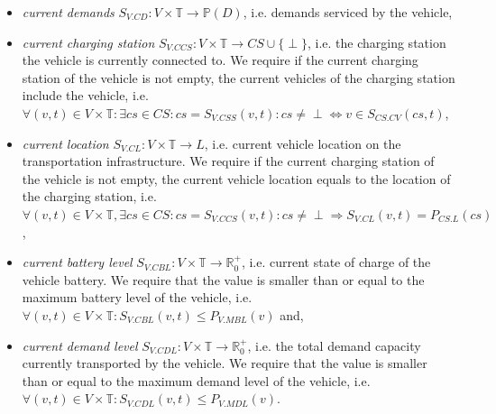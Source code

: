 \documentclass[graybox]{svmult}
\begin{document}
\begin{itemize}
	\item \textit{current demands} $S_{V.CD}: V \times \mathbb{T} \rightarrow \mathbb{P}(D)$, i.e. demands serviced by the vehicle,
	\item \textit{current charging station} $S_{V.CCS}: V \times \mathbb{T} \rightarrow CS \cup \{\perp\}$, i.e. the charging station the vehicle is currently connected to. We require if the current charging station of the vehicle is not empty, the current vehicles of the charging station include the vehicle, i.e.\ $\forall (v,t) \in V \times \mathbb{T}: \exists cs \in CS: cs = S_{V.CSS}(v,t): cs \neq \perp \Leftrightarrow v \in S_{CS.CV}(cs,t)$,
	\item \textit{current location} $S_{V.CL}: V \times \mathbb{T} \rightarrow L$, i.e. current vehicle location on the transportation infrastructure. We require if the current charging station of the vehicle is not empty, the current vehicle location equals to the location of the charging station, i.e.\ $\forall (v,t) \in V \times \mathbb{T}, \exists cs \in CS: cs = S_{V.CCS}(v,t): cs \neq \perp \Rightarrow S_{V.CL}(v,t)=P_{CS.L}(cs)$,
	\item \textit{current battery level} $S_{V.CBL}: V \times \mathbb{T} \rightarrow \mathbb{R}_0^+$, i.e. current state of charge of the vehicle battery. We require that the value is smaller than or equal to the maximum battery level of the vehicle, i.e.\ $\forall (v,t) \in V \times \mathbb{T}: S_{V.CBL}(v,t) \leq P_{V.MBL}(v)$ and,
	\item \textit{current demand level} $S_{V.CDL}: V \times \mathbb{T} \rightarrow \mathbb{R}_0^+$, i.e. the total demand capacity currently transported by the vehicle. We require that the value is smaller than or equal to the maximum demand level of the vehicle, i.e.\ $\forall (v,t) \in V \times \mathbb{T}: S_{V.CDL}(v,t) \leq P_{V.MDL}(v)$.
	
	
	
\end{itemize}
\noindent
\end{document}
